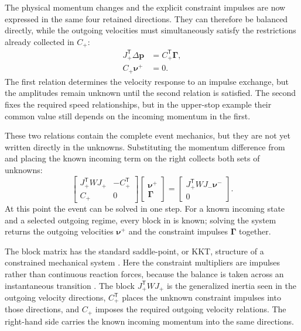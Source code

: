 \documentclass[11pt]{report}
\numberwithin{equation}{section}
\begin{document}
The physical momentum changes and the explicit constraint impulses are now
expressed in the same four retained directions.  They can therefore be
balanced directly, while the outgoing velocities must simultaneously satisfy
the restrictions already collected in \(C_+\):
\begin{equation}
    \begin{aligned}
        J_+^{\mathsf T}\Delta\boldsymbol p
        &=C_+^{\mathsf T}\boldsymbol\Gamma,\\
        C_+\boldsymbol\nu^+&=0.
    \end{aligned}
    \label{eq:finite_event_generalized_impulse_momentum}
\end{equation}
The first relation determines the velocity response to an impulse
exchange, but the amplitudes remain unknown until the second relation
is satisfied. The second fixes the required speed relationships, but
in the upper-stop example their common value still depends on the
incoming momentum in the first.

These two relations contain the complete event mechanics, but they are not
yet written directly in the unknowns. Substituting the momentum difference from
 and placing the known
incoming term on the right collects both sets of unknowns:
\begin{equation}
    \begin{bmatrix}
        J_+^{\mathsf T}WJ_+&-C_+^{\mathsf T}\\
        C_+&0
    \end{bmatrix}
    \begin{bmatrix}\boldsymbol\nu^+\\\boldsymbol\Gamma\end{bmatrix}
    =
    \begin{bmatrix}J_+^{\mathsf T}WJ_-\boldsymbol\nu^-\\0\end{bmatrix}.
    \label{eq:finite_event_kkt_system}
\end{equation}
At this point the event can be solved in one step.  For a known incoming
state and a selected outgoing regime, every block in
 is known; solving the system returns the
outgoing velocities \(\boldsymbol{\nu}^+\) and the constraint impulses
\(\boldsymbol{\Gamma}\) together.

The block matrix has the standard saddle-point, or KKT, structure of a
constrained mechanical system \citep{BenziGolubLiesen2005}.  Here the
constraint multipliers are impulses rather than continuous reaction forces,
because the balance is taken across an instantaneous transition
\citep{Stewart2000RigidImpact}.  The block
\(J_+^{\mathsf T}WJ_+\) is the generalized inertia seen in the outgoing
velocity directions, \(C_+^{\mathsf T}\) places the unknown constraint
impulses into those directions, and \(C_+\) imposes the required outgoing
velocity relations.  The right-hand side carries the known incoming momentum
into the same directions.
\end{document}
